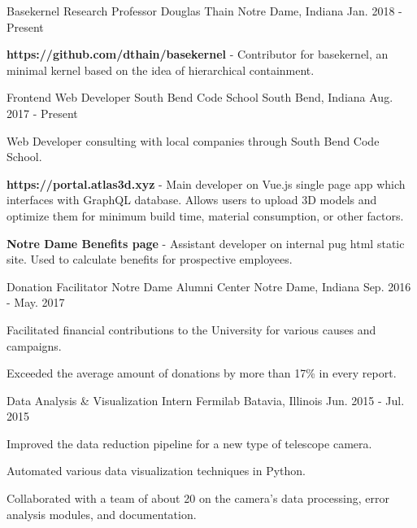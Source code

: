 \begin{cventries}
  \cventry
    {Basekernel Research}
    {Professor Douglas Thain}
    {Notre Dame, Indiana}
    {Jan. 2018 - Present}
    {
      \begin{cvitems}
        \item {{\bf https://github.com/dthain/basekernel} - Contributor for basekernel, an minimal kernel based on the idea of hierarchical containment.}
      \end{cvitems}
    }
  \cventry
    {Frontend Web Developer}
    {South Bend Code School}
    {South Bend, Indiana}
    {Aug. 2017 - Present}
    {
      \begin{cvitems}
        \item {Web Developer consulting with local companies through South Bend Code School.}
        \item {{\bf https://portal.atlas3d.xyz} - Main developer on Vue.js single page app which interfaces with GraphQL database.  Allows users to upload 3D models and optimize them for minimum build time, material consumption, or other factors.}
        \item {{\bf Notre Dame Benefits page} - Assistant developer on internal pug html static site.  Used to calculate benefits for prospective employees.}
      \end{cvitems}
    }
  \cventry
    {Donation Facilitator}
    {Notre Dame Alumni Center}
    {Notre Dame, Indiana}
    {Sep. 2016 - May. 2017}
    {
      \begin{cvitems}
        \item {Facilitated financial contributions to the University for various causes and campaigns.}
        \item {Exceeded the average amount of donations by more than 17\% in every report.}
      \end{cvitems}
    }
  \cventry
    {Data Analysis \& Visualization Intern}
    {Fermilab}
    {Batavia, Illinois}
    {Jun. 2015 - Jul. 2015}
    {
      \begin{cvitems}
        \item {Improved the data reduction pipeline for a new type
of telescope camera.}
        \item {Automated various data visualization techniques in Python.}
        \item {Collaborated with a team of about 20 on the camera’s data processing, error analysis modules, and documentation.}
      \end{cvitems}
    }
\end{cventries}
